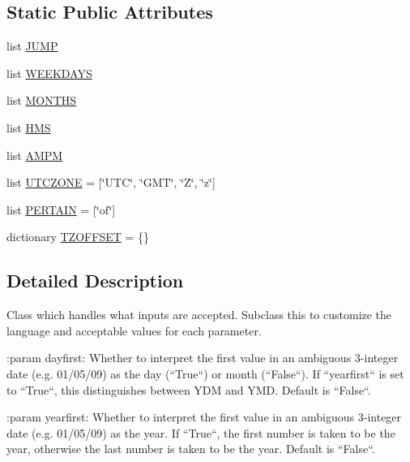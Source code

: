 \subsection*{Static Public Attributes}
\begin{DoxyCompactItemize}
\item 
list \hyperlink{classdateutil_1_1parser_1_1__parser_1_1parserinfo_ae755b279aecf7c71df0b24bbac71f218}{J\+U\+MP}
\item 
list \hyperlink{classdateutil_1_1parser_1_1__parser_1_1parserinfo_ad6f2afa877c1cd6f393e941982bc7b3b}{W\+E\+E\+K\+D\+A\+YS}
\item 
list \hyperlink{classdateutil_1_1parser_1_1__parser_1_1parserinfo_acf321dcd5ad2b5c0e8a0af6c7054ee88}{M\+O\+N\+T\+HS}
\item 
list \hyperlink{classdateutil_1_1parser_1_1__parser_1_1parserinfo_aadb954c713f89143cfcdf48bac5fee5c}{H\+MS}
\item 
list \hyperlink{classdateutil_1_1parser_1_1__parser_1_1parserinfo_a7ea3bd6f0c77f981d46e15b2d7fb7e74}{A\+M\+PM}
\item 
list \hyperlink{classdateutil_1_1parser_1_1__parser_1_1parserinfo_a5ef21bd584c75053d1f273fe12176e3d}{U\+T\+C\+Z\+O\+NE} = \mbox{[}\char`\"{}U\+TC\char`\"{}, \char`\"{}G\+MT\char`\"{}, \char`\"{}Z\char`\"{}, \char`\"{}z\char`\"{}\mbox{]}
\item 
list \hyperlink{classdateutil_1_1parser_1_1__parser_1_1parserinfo_a8f664f7f905f30e4cb1d3b97337eb6d2}{P\+E\+R\+T\+A\+IN} = \mbox{[}\char`\"{}of\char`\"{}\mbox{]}
\item 
dictionary \hyperlink{classdateutil_1_1parser_1_1__parser_1_1parserinfo_a323d7c8c7b4e41abfae63547c7f57016}{T\+Z\+O\+F\+F\+S\+ET} = \{\}
\end{DoxyCompactItemize}


\subsection{Detailed Description}
\begin{DoxyVerb}Class which handles what inputs are accepted. Subclass this to customize
the language and acceptable values for each parameter.

:param dayfirst:
    Whether to interpret the first value in an ambiguous 3-integer date
    (e.g. 01/05/09) as the day (``True``) or month (``False``). If
    ``yearfirst`` is set to ``True``, this distinguishes between YDM
    and YMD. Default is ``False``.

:param yearfirst:
    Whether to interpret the first value in an ambiguous 3-integer date
    (e.g. 01/05/09) as the year. If ``True``, the first number is taken
    to be the year, otherwise the last number is taken to be the year.
    Default is ``False``.
\end{DoxyVerb}
 

